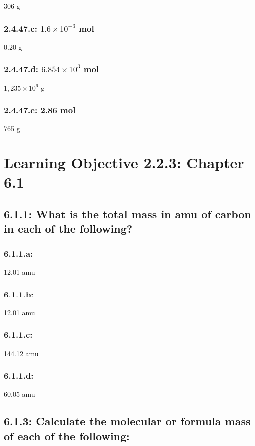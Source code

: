 \documentclass[11pt, letterpaper]{article}
\begin{document}
306 g

\subsubsection*{2.4.47.c: $1.6 \times 10^{-3}$ mol }

0.20 g

\subsubsection*{2.4.47.d: $6.854 \times 10^{3}$ mol }

$1,235 \times 10^{6}$ g

\subsubsection*{2.4.47.e: 2.86 mol }

765 g



\section*{Learning Objective 2.2.3: Chapter 6.1}
\subsection*{6.1.1: What is the total mass in amu of carbon in each of the following?}
\subsubsection*{6.1.1.a: }
12.01 amu
\subsubsection*{6.1.1.b: }
12.01 amu
\subsubsection*{6.1.1.c: }
144.12 amu
\subsubsection*{6.1.1.d: }
60.05 amu

\subsection*{6.1.3: Calculate the molecular or formula mass of each of the following:}
\end{document}
